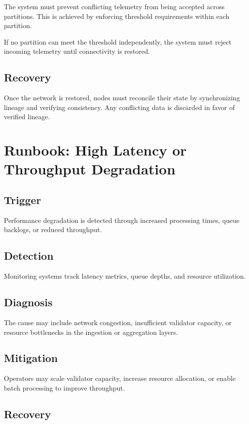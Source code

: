 The system must prevent conflicting telemetry from being accepted across partitions. This is achieved by enforcing threshold requirements within each partition.

If no partition can meet the threshold independently, the system must reject incoming telemetry until connectivity is restored.

\subsection{Recovery}

Once the network is restored, nodes must reconcile their state by synchronizing lineage and verifying consistency. Any conflicting data is discarded in favor of verified lineage.

\section{Runbook: High Latency or Throughput Degradation}

\subsection{Trigger}

Performance degradation is detected through increased processing times, queue backlogs, or reduced throughput.

\subsection{Detection}

Monitoring systems track latency metrics, queue depths, and resource utilization.

\subsection{Diagnosis}

The cause may include network congestion, insufficient validator capacity, or resource bottlenecks in the ingestion or aggregation layers.

\subsection{Mitigation}

Operators may scale validator capacity, increase resource allocation, or enable batch processing to improve throughput.

\subsection{Recovery}

